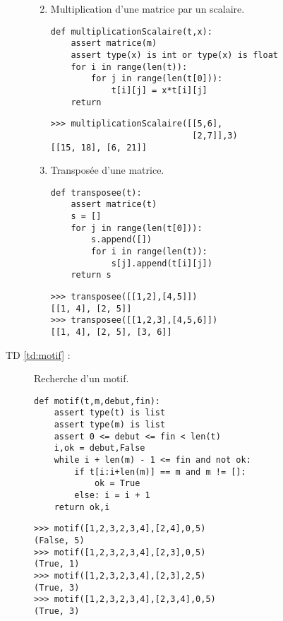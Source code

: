 \begin{description}
\begin{enumerate}
\newpage
\item Multiplication d'une matrice par un scalaire.

\begin{py}{6cm}
\begin{verbatim}
def multiplicationScalaire(t,x):
    assert matrice(m)
    assert type(x) is int or type(x) is float
    for i in range(len(t)):
        for j in range(len(t[0])):
            t[i][j] = x*t[i][j]
    return
\end{verbatim}
\end{py}
\hfill
\begin{py}{6cm}
\begin{verbatim}
>>> multiplicationScalaire([[5,6],
                            [2,7]],3)
[[15, 18], [6, 21]]
\end{verbatim}
\end{py}
\vspace*{2mm}

\item Transposée d'une matrice.

\begin{py}{6cm}
\begin{verbatim}
def transposee(t):
    assert matrice(t)
    s = []
    for j in range(len(t[0])):
        s.append([])
        for i in range(len(t)):
            s[j].append(t[i][j])
    return s
\end{verbatim}
\end{py}
\hfill
\begin{py}{6cm}
\begin{verbatim}
>>> transposee([[1,2],[4,5]])
[[1, 4], [2, 5]]
>>> transposee([[1,2,3],[4,5,6]])
[[1, 4], [2, 5], [3, 6]]
\end{verbatim}
\end{py}
\vspace*{2mm}

\end{enumerate}

\item[TD \ref{td:motif} :] Recherche d'un motif.\\

\begin{py}{6cm}
\begin{verbatim}
def motif(t,m,debut,fin):
    assert type(t) is list
    assert type(m) is list
    assert 0 <= debut <= fin < len(t)
    i,ok = debut,False
    while i + len(m) - 1 <= fin and not ok:
        if t[i:i+len(m)] == m and m != []:
            ok = True
        else: i = i + 1
    return ok,i
\end{verbatim}
\end{py}
\hfill
\begin{py}{6cm}
\begin{verbatim}
>>> motif([1,2,3,2,3,4],[2,4],0,5)
(False, 5)
>>> motif([1,2,3,2,3,4],[2,3],0,5)
(True, 1)
>>> motif([1,2,3,2,3,4],[2,3],2,5)
(True, 3)
>>> motif([1,2,3,2,3,4],[2,3,4],0,5)
(True, 3)
\end{verbatim}
\end{py}
\vspace*{2mm}


\end{description}
